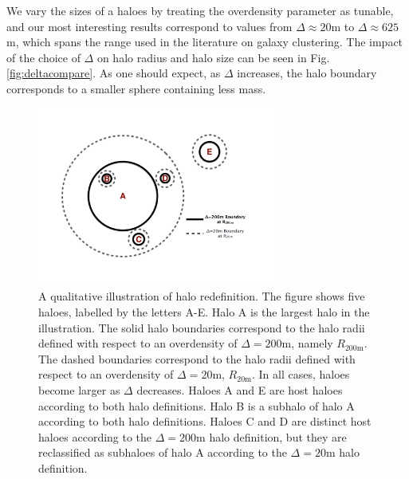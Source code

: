 \documentclass[usenatbib,fleqn]{mnras}
\begin{document}
We vary the sizes of a haloes by treating the overdensity parameter as tunable, and our most interesting results correspond to values from $\Delta \approx 20$m to $\Delta \approx 625$m, which spans the range used in the literature on galaxy clustering. The impact of the choice of $\Delta$ on halo radius and halo size can be seen in Fig.~ \ref{fig:deltacompare}. As one should expect, as $\Delta$ increases, the halo boundary corresponds to a smaller sphere containing less mass. 

\begin{figure}
\centering
\includegraphics[width=0.7\textwidth]{cartoon_halos.pdf}
\caption{
A qualitative illustration of halo redefinition. The figure shows five haloes, labelled by the letters A-E. Halo A is the largest halo in the illustration. The solid halo boundaries correspond to the halo radii defined with respect to an overdensity of $\Delta=200$m, namely $R_{200\text{m}}$. The dashed boundaries correspond to the halo radii defined with respect to an overdensity of $\Delta=20$m, $R_{20\text{m}}$. In all cases, haloes become larger as $\Delta$ decreases. Haloes A and E are host haloes according to both halo definitions. Halo B is a subhalo of halo A according to both halo definitions. Haloes C and D are distinct host haloes according to the $\Delta=200$m halo definition, but they are reclassified as subhaloes of halo A according to the $\Delta=20$m halo definition.
}
\label{fig:halocartoon}
\end{figure}
\end{document}
